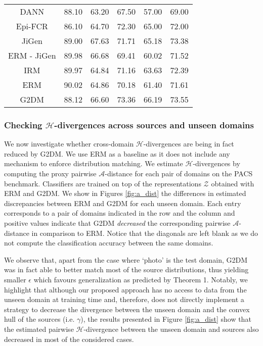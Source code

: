 \documentclass{article}
\begin{document}
\begin{minipage}{\textwidth}
\begin{minipage}[t]{0.49\textwidth}
{\begin{tabular}{cccccc}
DANN      & 88.10  & 63.20  & 67.50  & 57.00    & 69.00      \\
Epi-FCR   & 86.10  & 64.70  & 72.30  & 65.00 & 72.00      \\
JiGen     & 89.00    & 67.63 & 71.71 & 65.18 & 73.38   \\
ERM - JiGen  & 89.98 & 66.68 & 69.41 & 60.02 & 71.52   \\
IRM        & 89.97 & 64.84 & 71.16  & 63.63 & 72.39         \\
ERM         & 90.02 & 64.86 & 70.18 & 61.40  & 71.61   \\ \hline
G2DM       & 88.12 & 66.60  & 73.36 & 
 66.19 & 73.55   \\ \hline
\end{tabular}
}
\label{res:tab_pacs}
\end{minipage}
\end{minipage}


\vspace{0.3cm}
\subsubsection{Checking $\boldsymbol{\mathcal{H}}$-divergences across sources and unseen domains}\label{exp:h_div}
We now investigate whether cross-domain $\mathcal{H}$-divergences are being in fact reduced by G2DM. We use ERM as a baseline as it does not include any mechanism to enforce distribution matching. We estimate $\mathcal{H}$-divergences by computing the proxy pairwise $\mathcal{A}$-distance \cite{ben2007analysis} for each pair of domains on the PACS benchmark. Classifiers are trained on top of the representations $\mathcal{Z}$ obtained with ERM and G2DM. We show in Figures \ref{fig:a_dist} the differences in estimated discrepancies between ERM and G2DM for each unseen domain. Each entry corresponds to a pair of domains indicated in the row and the column and positive values indicate that G2DM \emph{decreased} the corresponding pairwise $\mathcal{A}$-distance in comparison to ERM. Notice that the diagonals are left blank as we do not compute the classification accuracy between the same domains. 

We observe that, apart from the case where `photo' is the test domain, G2DM was in fact able to better match most of the source distributions, thus yielding smaller $\epsilon$ which favours generalization as predicted by Theorem 1. Notably, we highlight that although our proposed approach has no access to data from the unseen domain at training time and, therefore, does not directly implement a strategy to decrease the divergence between the unseen domain and the convex hull of the sources (i.e. $\gamma$), the results presented in Figure \ref{fig:a_dist} show that the estimated pairwise $\mathcal{H}$-divergence between the unseen domain and sources also decreased in most of the considered cases. 
\end{document}
